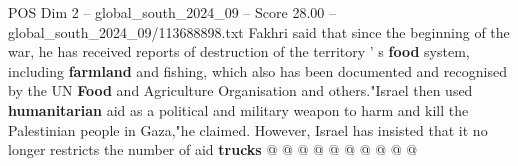 \begin{textsample}{POS Dim 2 – global\_south\_2024\_09 – Score 28.00 – global\_south\_2024\_09/113688898.txt}
Fakhri said that since the beginning of the war, he has received reports of destruction of the territory ' s \textbf{food} system, including \textbf{farmland} and fishing, which also has been documented and recognised by the UN \textbf{Food} and Agriculture Organisation and others."Israel then used \textbf{humanitarian} aid as a political and military weapon to harm and kill the Palestinian people in Gaza,"he claimed.
However, Israel has insisted that it no longer restricts the number of aid \textbf{trucks} @ @ @ @ @ @ @ @ @ @

\end{textsample}
